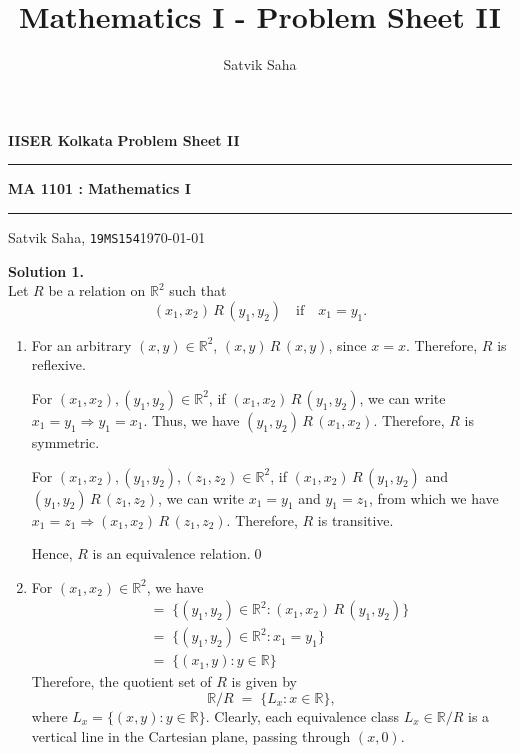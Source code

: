 \documentclass[10pt]{article}
\title{Mathematics I - Problem Sheet II}
\author{Satvik Saha}
\date{}
\begin{document}
        \par\textbf{IISER Kolkata} \hfill \textbf{Problem Sheet II}
        \vspace{3pt}
        \hrule
        \vspace{3pt}
        \begin{center}
                \LARGE{\textbf{MA 1101 : Mathematics I}}
        \end{center}
        \vspace{3pt}
        \hrule
        \vspace{3pt}
        Satvik Saha, \texttt{19MS154}\hfill\today
        \vspace{20pt}

        \textbf{Solution 1.}\\
        Let $R$ be a relation on $\mathbb{R}^2$ such that
        \[(x_1, x_2)\,R\,(y_1, y_2) \quad\text{if}\quad x_1 = y_1.\]
        \begin{enumerate}
                \item For an arbitrary $(x, y)\in\mathbb{R}^2$, $(x, y)\,R\,(x, y)$, since $x = x$. Therefore, $R$ is reflexive.

                For $(x_1, x_2), (y_1, y_2) \in \mathbb{R}^2$, if $(x_1, x_2)\,R\,(y_1, y_2)$, we can write $x_1 = y_1 \Rightarrow y_1 = x_1$.
                Thus, we have $(y_1, y_2)\,R\,(x_1, x_2)$. Therefore, $R$ is symmetric.

                For $(x_1, x_2), (y_1, y_2), (z_1, z_2) \in \mathbb{R}^2$, if $(x_1, x_2)\,R\,(y_1, y_2)$ and $(y_1, y_2)\,R\,(z_1, z_2)$,
                we can write $x_1 = y_1$ and $y_1 = z_1$, from which we have $x_1 = z_1 \Rightarrow (x_1, x_2)\,R\,(z_1, z_2)$.
                Therefore, $R$ is transitive.

                Hence, $R$ is an equivalence relation.\qed

                \item For $(x_1, x_2) \in \mathbb{R}^2$, we have
                \begin{align*}
                [(x_1, x_2)] \;&=\; \{(y_1, y_2) \in \mathbb{R}^2 : (x_1, x_2)\,R\,(y_1, y_2)\} \\
                        \;&=\; \{(y_1, y_2) \in \mathbb{R}^2 : x_1 = y_1\}\\
                        \;&=\; \{(x_1, y) : y \in \mathbb{R}\}
                \end{align*}
                Therefore, the quotient set of $R$ is given by $$\mathbb{R}/R \;=\; \{L_x : x \in \mathbb{R}\},$$
                where $L_x = \{(x, y) : y \in \mathbb{R}\}$.
                Clearly, each equivalence class $L_x \in \mathbb{R}/R$ is a vertical line in the Cartesian plane, passing through $(x, 0)$.
        \end{enumerate}
\end{document}
